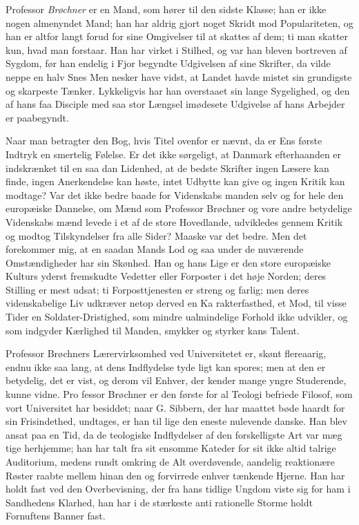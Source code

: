 \documentclass[12pt,a4paper,openany]{book}
\newcommand{\opage}[1]{\marginnote{\footnotesize\textit{[#1]}}}
\begin{document}
Professor \emph{Brøchner} er en Mand, som hører til den sidste
Klasse; han er ikke nogen almenyndet Mand; han har aldrig
gjort noget Skridt mod Populariteten, og han er altfor langt
forud for sine Omgivelser til at skattes af dem; ti man skatter
\opage{116}kun, hvad man forstaar. Han har virket i Stilhed, og var han
bleven bortreven af Sygdom, før han endelig i Fjor begyndte
Udgivelsen af sine Skrifter, da vilde neppe en halv Snes Men\-%
nesker have vidst, at Landet havde mistet sin grundigste og
skarpeste Tænker. Lykkeligvis har han overstaaet sin lange
Sygelighed, og den af hans faa Disciple med saa stor Længsel
imødesete Udgivelse af hans Arbejder er paabegyndt.

Naar man betragter den Bog, hvis Titel ovenfor er nævnt,
da er Ens første Indtryk en smertelig Følelse. Er det ikke
sørgeligt, at Danmark efterhaanden er indskrænket til en saa\-%
dan Lidenhed, at de bedste Skrifter ingen Læsere kan finde,
ingen Anerkendelse kan høste, intet Udbytte kan give og ingen
Kritik kan modtage? Var det ikke bedre baade for Videnskabs\-%
manden selv og for hele den europæiske Dannelse, om Mænd
som Professor Brøchner og vore andre betydelige Videnskabs\-%
mænd levede i et af de store Hovedlande, udvikledes gennem
Kritik og modtog Tilskyndelser fra alle Sider? Maaske var det
bedre. Men det forekommer mig, at en saadan Mands Lod og\-%
saa under de nuværende Omstændigheder har sin Skønhed.
Han og hans Lige er den store europæiske Kulturs yderst
fremskudte Vedetter eller Forposter i det høje Norden; deres
Stilling er mest udsat; ti Forposttjenesten er streng og farlig;
men deres videnskabelige Liv udkræver netop derved en Ka\-%
rakterfasthed, et Mod, til visse Tider en Soldater-Dristighed,
som mindre ualmindelige Forhold ikke udvikler, og som indgyder
Kærlighed til Manden, smykker og styrker kans Talent.

Professor Brøchners Lærervirksomhed ved Universitetet er,
skønt flereaarig, endnu ikke saa lang, at dens Indflydelse tyde\-%
ligt kan spores; men at den er betydelig, det er vist, og derom vil
Enhver, der kender mange yngre Studerende, kunne vidne. Pro\-%
fessor Brøchner er den første for al Teologi befriede Filosof,
som vort Universitet har besiddet; naar G. Sibbern, der har
maattet bøde haardt for sin Frisindethed, undtages, er han til\-%
lige den eneste nulevende danske. Han blev ansat paa en Tid,
da de teologiske Indflydelser af den forskelligste Art var mæg\-%
tige herhjemme; han har talt fra sit ensomme Kateder for sit
ikke altid talrige Auditorium, medens rundt omkring de Alt
overdøvende, aandelig reaktionære Røster raabte mellem hinan\-%
den og forvirrede enhver tænkende Hjerne. Han har holdt
fast ved den Overbevisning, der fra hans tidlige Ungdom viste
\opage{117}sig for ham i Sandhedens Klarhed, han har i de stærkeste anti\-%
rationelle Storme holdt Fornuftens Banner fast.
\end{document}
